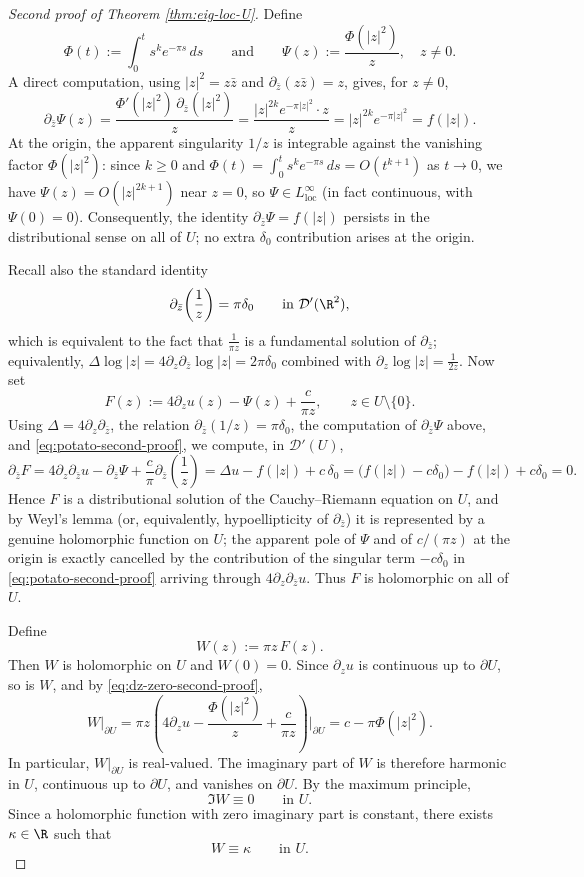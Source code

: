 \begin{proof}[Second proof of Theorem \ref{thm:eig-loc-U}]
Define
\[
\Phi(t):=\int_0^t s^k e^{-\pi s}\,ds
\qquad\text{and}\qquad
\Psi(z):=\frac{\Phi(|z|^2)}{z},
\quad z\neq 0.
\]
A direct computation, using \(|z|^2=z\bar z\) and \(\partial_{\bar z}(z\bar z)=z\), gives, for
\(z\neq 0\),
\[
\partial_{\bar z}\Psi(z)
=
\frac{\Phi'(|z|^2)\,\partial_{\bar z}(|z|^2)}{z}
=
\frac{|z|^{2k}e^{-\pi|z|^2}\cdot z}{z}
=
|z|^{2k}e^{-\pi|z|^2}
=
f(|z|).
\]
At the origin, the apparent singularity \(1/z\) is integrable against the vanishing factor
\(\Phi(|z|^2)\): since \(k\ge 0\) and \(\Phi(t)=\int_0^t s^k e^{-\pi s}\,ds=O(t^{k+1})\) as
\(t\to 0\), we have \(\Psi(z)=O(|z|^{2k+1})\) near \(z=0\), so \(\Psi\in L^\infty_{\mathrm{loc}}\)
(in fact continuous, with \(\Psi(0)=0\)). Consequently, the identity
\(\partial_{\bar z}\Psi=f(|z|)\) persists in the distributional sense on all of \(U\); no extra
\(\delta_0\) contribution arises at the origin.

Recall also the standard identity
\[
\partial_{\bar z}\!\left(\frac{1}{z}\right)=\pi\delta_0
\qquad\text{in }\mathcal D'(\R^2),
\]
which is equivalent to the fact that \(\frac{1}{\pi z}\) is a fundamental solution of
\(\partial_{\bar z}\); equivalently, \(\Delta\log|z|=4\partial_z\partial_{\bar z}\log|z|=2\pi\delta_0\)
combined with \(\partial_z\log|z|=\frac{1}{2z}\). Now set
\[
F(z):=4\partial_z u(z)-\Psi(z)+\frac{c}{\pi z},
\qquad z\in U\setminus\{0\}.
\]
Using \(\Delta=4\partial_z\partial_{\bar z}\), the relation \(\partial_{\bar z}(1/z)=\pi\delta_0\),
the computation of \(\partial_{\bar z}\Psi\) above, and \eqref{eq:potato-second-proof}, we
compute, in \(\mathcal D'(U)\),
\[
\partial_{\bar z}F
=
4\partial_z\partial_{\bar z}u-\partial_{\bar z}\Psi+\frac{c}{\pi}\partial_{\bar z}\!\left(\frac{1}{z}\right)
=
\Delta u-f(|z|)+c\,\delta_0
=
\bigl(f(|z|)-c\delta_0\bigr)-f(|z|)+c\delta_0
=0.
\]
Hence \(F\) is a distributional solution of the Cauchy--Riemann equation on \(U\), and by
Weyl's lemma (or, equivalently, hypoellipticity of \(\partial_{\bar z}\)) it is represented by a
genuine holomorphic function on \(U\); the apparent pole of \(\Psi\) and of \(c/(\pi z)\) at the
origin is exactly cancelled by the contribution of the singular term \(-c\delta_0\) in
\eqref{eq:potato-second-proof} arriving through \(4\partial_z\partial_{\bar z}u\). Thus \(F\) is
holomorphic on all of \(U\).

Define
\[
W(z):=\pi z\,F(z).
\]
Then \(W\) is holomorphic on \(U\) and \(W(0)=0\). Since \(\partial_z u\) is continuous up to
\(\partial U\), so is \(W\), and by \eqref{eq:dz-zero-second-proof},
\[
W|_{\partial U}
=
\pi z\left(4\partial_z u-\frac{\Phi(|z|^2)}{z}+\frac{c}{\pi z}\right)\Big|_{\partial U}
=
c-\pi\Phi(|z|^2).
\]
In particular, \(W|_{\partial U}\) is real-valued. The imaginary part of \(W\) is therefore
harmonic in \(U\), continuous up to \(\partial U\), and vanishes on \(\partial U\). By the
maximum principle,
\[
\Im W\equiv 0
\qquad\text{in }U.
\]
Since a holomorphic function with zero imaginary part is constant, there exists \(\kappa\in\R\)
such that
\[
W\equiv \kappa
\qquad\text{in }U.
\]


\end{proof}
